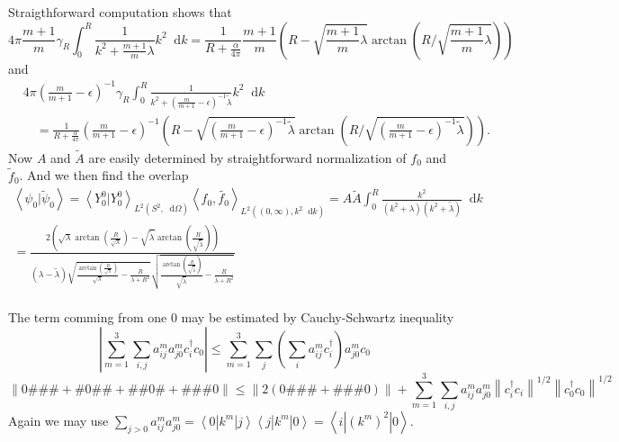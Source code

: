 \documentclass[a4paper,11pt]{article}
\newcommand{\norm}[1]{\left\lVert #1 \right\rVert}
\newcommand{\abs}[1]{\left\lvert #1 \right\rvert}
\renewcommand{\braket}[1]{\left\langle#1\right\rangle}
\newcommand*\diff{\mathop{}\!\mathrm{d}}
\numberwithin{equation}{section}
\begin{document}
Straigthforward computation shows that \begin{equation}
4\pi\frac{m+1}{m}\gamma_R\int_{0}^{R}\frac{1}{k^2+\frac{m+1}{m}\lambda} k^2\diff k=\frac{1}{R+\frac{\alpha}{4\pi}}\frac{m+1}{m}\left(R-\sqrt{\frac{m+1}{m}\lambda}\arctan\left(R\Bigg/\sqrt{\frac{m+1}{m}\lambda}\right)\right)
\end{equation}
and
\begin{equation}
\begin{aligned}
&4\pi\left(\frac{m}{m+1}-\epsilon\right)^{-1}\gamma_R\int_{0}^{R}\frac{1}{k^2+\left(\frac{m}{m+1}-\epsilon\right)^{-1}\tilde{\lambda}} k^2\diff k \\&\quad=\frac{1}{R+\frac{\alpha}{4\pi}}\left(\frac{m}{m+1}-\epsilon\right)^{-1}\left(R-\sqrt{\left(\frac{m}{m+1}-\epsilon\right)^{-1}\tilde{\lambda}}\arctan\left(R\Bigg/\sqrt{\left(\frac{m}{m+1}-\epsilon\right)^{-1}\tilde{\lambda}}\right)\right).
\end{aligned}
\end{equation}
Now $ A $ and $ \tilde{A} $ are easily determined by straightforward normalization of $ f_0 $ and $ \tilde{f}_0 $. And we then find the overlap \begin{equation}
\begin{aligned}
\braket{\psi_0|\tilde{\psi}_0}=\braket{Y_0^0|Y_0^0}_{L^2(S^2,\diff\Omega)}\braket{f_0,\tilde{f_0}}_{L^2((0,\infty),k^2\diff k)}=A\tilde{A}\int_{0}^{R}\frac{k^2}{(k^2+\lambda)(k^2+\tilde{\lambda})}\diff k\\
=\frac{2 \left(\sqrt{\lambda } \arctan\left(\frac{R}{\sqrt{\lambda }}\right)-\sqrt{\tilde{\lambda}
	} \arctan\left(\frac{R}{\sqrt{\tilde{\lambda} }}\right)\right)}{(\lambda -\tilde{\lambda} )
	\sqrt{\frac{\arctan\left(\frac{R}{\sqrt{\lambda }}\right)}{\sqrt{\lambda
			}}-\frac{R}{\lambda +R^2}} \sqrt{\frac{\arctan\left(\frac{R}{\sqrt{\tilde{\lambda}
			}}\right)}{\sqrt{\tilde{\lambda} }}-\frac{R}{\tilde{\lambda} +R^2}}}
\end{aligned}
\end{equation}
\\
The term comming from one $ 0 $ may be estimated by Cauchy-Schwartz inequality
\begin{equation}
\abs{\sum_{m=1}^{3}\sum_{i,j}a^m_{ij}a^m_{j0}c_i^\dagger  c_0}\leq \sum_{m=1}^{3}\sum_{j}\left(\sum_{i}a^m_{ij}c_i^\dagger\right) a^m_{j0}  c_0
\end{equation}
\begin{equation}
\norm{0\#\#\#+\#0\#\#+\#\#0\#+\#\#\#0}\leq\norm{2(0\#\#\#+\#\#\#0)}+\sum_{m=1}^{3}\sum_{i,j}a^m_{ij}a^m_{j0}\norm{c_i^\dagger c_i}^{1/2}\norm{c_0^\dagger c_0}^{1/2}
\end{equation}
Again we may use $ \sum_{j>0} a^m_{ij}a^m_{j0}=\braket{0|k^m|j}\braket{j|k^m|0}=\braket{i|(k^m)^2|0} $.
	\appendix
\end{document}
